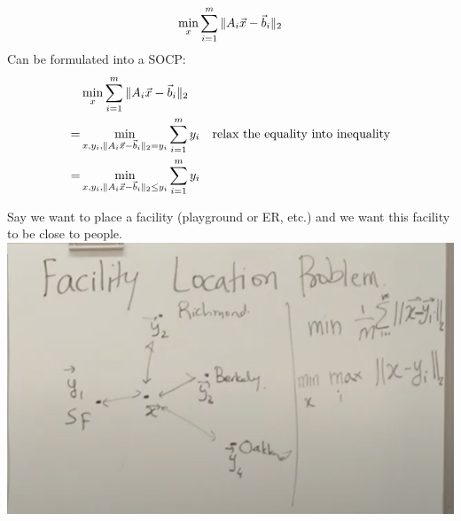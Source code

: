 \begin{example}
	\begin{align*}
		\min_x\sum_{i=1}^m\|A_i\vec{x}-\vec{b}_i\|_2
	\end{align*}
	Can be formulated into a SOCP:
	\begin{align*}
		&\min_x\sum_{i=1}^m\|A_i\vec{x}-\vec{b}_i\|_2\\
		=&\min_{x, y_i, \|A_i\vec{x}-\vec{b}_i\|_2 = y_i}\sum_{i=1}^my_i& \text{relax the equality into inequality}\\
		=&\min_{x, y_i, \|A_i\vec{x}-\vec{b}_i\|_2 \le y_i}\sum_{i=1}^my_i
	\end{align*}
\end{example}

\begin{example}
		Say we want to place a facility (playground or ER, etc.) and we want this facility to be close to people.\\
	\center
	\includegraphics{img/FLP.png}
\end{example}

